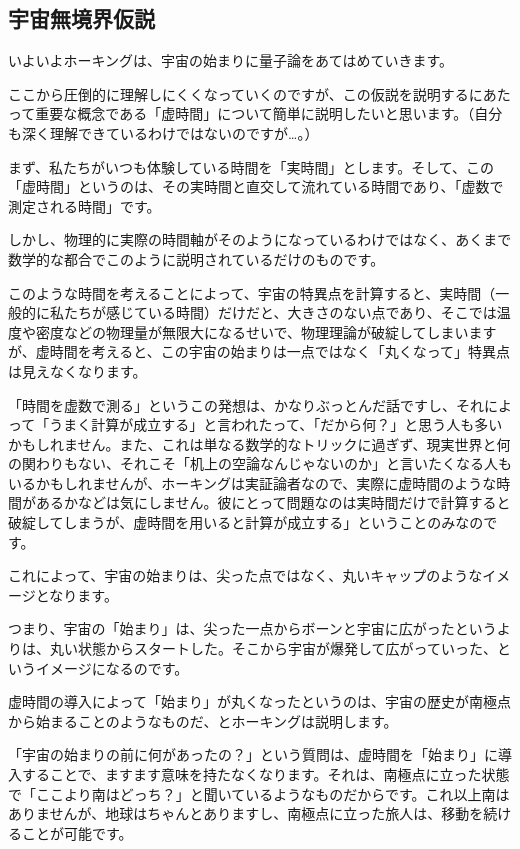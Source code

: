 \documentclass[10pt,b5paper,papersize,dvipdfmx]{jsbook}
\begin{document}
\subsection{宇宙無境界仮説}
いよいよホーキングは、宇宙の始まりに量子論をあてはめていきます。\par
ここから圧倒的に理解しにくくなっていくのですが、この仮説を説明するにあたって重要な概念である「虚時間」について簡単に説明したいと思います。（自分も深く理解できているわけではないのですが…。）\par
まず、私たちがいつも体験している時間を「実時間」とします。そして、この「虚時間」というのは、その実時間と直交して流れている時間であり、「虚数で測定される時間」です。\par
しかし、物理的に実際の時間軸がそのようになっているわけではなく、あくまで数学的な都合でこのように説明されているだけのものです。\par
このような時間を考えることによって、宇宙の特異点を計算すると、実時間（一般的に私たちが感じている時間）だけだと、大きさのない点であり、そこでは温度や密度などの物理量が無限大になるせいで、物理理論が破綻してしまいますが、虚時間を考えると、この宇宙の始まりは一点ではなく「丸くなって」特異点は見えなくなります。\par
「時間を虚数で測る」というこの発想は、かなりぶっとんだ話ですし、それによって「うまく計算が成立する」と言われたって、「だから何？」と思う人も多いかもしれません。また、これは単なる数学的なトリックに過ぎず、現実世界と何の関わりもない、それこそ「机上の空論なんじゃないのか」と言いたくなる人もいるかもしれませんが、ホーキングは実証論者なので、実際に虚時間のような時間があるかなどは気にしません。彼にとって問題なのは実時間だけで計算すると破綻してしまうが、虚時間を用いると計算が成立する」ということのみなのです。\par
これによって、宇宙の始まりは、尖った点ではなく、丸いキャップのようなイメージとなります。\par
つまり、宇宙の「始まり」は、尖った一点からボーンと宇宙に広がったというよりは、丸い状態からスタートした。そこから宇宙が爆発して広がっていった、というイメージになるのです。\par
虚時間の導入によって「始まり」が丸くなったというのは、宇宙の歴史が南極点から始まることのようなものだ、とホーキングは説明します。\par
「宇宙の始まりの前に何があったの？」という質問は、虚時間を「始まり」に導入することで、ますます意味を持たなくなります。それは、南極点に立った状態で「ここより南はどっち？」と聞いているようなものだからです。これ以上南はありませんが、地球はちゃんとありますし、南極点に立った旅人は、移動を続けることが可能です。\par
\end{document}
